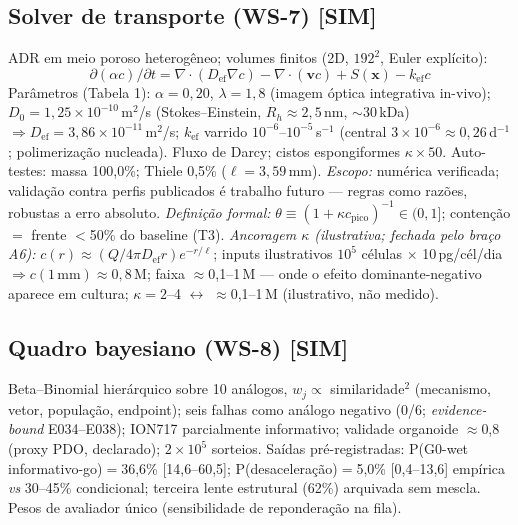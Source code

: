\documentclass[10pt,twocolumn]{article}
\begin{document}
\subsection{Solver de transporte (WS-7) [SIM]}
ADR em meio poroso heterogêneo; volumes finitos (2D, $192^2$, Euler explícito):
\begin{equation}\partial(\alpha c)/\partial t=\nabla\!\cdot\!(D_{\text{ef}}\nabla c)-\nabla\!\cdot\!(\mathbf{v}c)+S(\mathbf{x})-k_{\text{ef}}c\end{equation}
Parâmetros (Tabela 1): $\alpha{=}0,20$, $\lambda{=}1,8$ (imagem óptica integrativa in-vivo); $D_0{=}1,25{\times}10^{-10}$\,m$^2$/s (Stokes--Einstein, $R_h{\approx}2,5$\,nm, $\sim$30\,kDa) $\Rightarrow D_{\text{ef}}{=}3,86{\times}10^{-11}$\,m$^2$/s; $k_{\text{ef}}$ varrido $10^{-6}$--$10^{-5}$\,s$^{-1}$ (central $3{\times}10^{-6}\approx0,26$\,d$^{-1}$; polimerização nucleada). Fluxo de Darcy; cistos espongiformes $\kappa\times50$. Auto-testes: massa 100,0\%; Thiele 0,5\% ($\ell{=}3,59$\,mm). \emph{Escopo:} numérica verificada; validação contra perfis publicados é trabalho futuro --- regras como razões, robustas a erro absoluto. \emph{Definição formal:} $\theta\equiv(1+\kappa c_{\text{pico}})^{-1}\in(0,1]$; contenção $=$ frente $<$50\% do baseline (T3). \emph{Ancoragem $\kappa$ (ilustrativa; fechada pelo braço A6):} $c(r)\approx(Q/4\pi D_{\text{ef}}r)e^{-r/\ell}$; inputs ilustrativos $10^5$ células $\times$ 10\,pg/cél/dia $\Rightarrow c(1\,\text{mm})\approx0,8$\,\textmu M; faixa $\approx$0,1--1\,\textmu M --- onde o efeito dominante-negativo aparece em cultura; $\kappa{=}2$--4 $\leftrightarrow$ $\approx$0,1--1\,\textmu M (ilustrativo, não medido).

\subsection{Quadro bayesiano (WS-8) [SIM]}
Beta--Binomial hierárquico sobre 10 análogos, $w_j\propto$ similaridade$^2$ (mecanismo, vetor, população, endpoint); seis falhas como análogo negativo (0/6; \emph{evidence-bound} E034--E038); ION717 parcialmente informativo; validade organoide $\approx$0,8 (proxy PDO, declarado); $2{\times}10^5$ sorteios. Saídas pré-registradas: P(G0-wet informativo-go)$=$36,6\% [14,6--60,5]; P(desaceleração)$=$5,0\% [0,4--13,6] empírica \emph{vs} 30--45\% condicional; terceira lente estrutural (62\%) arquivada sem mescla. Pesos de avaliador único (sensibilidade de reponderação na fila).
\end{document}
